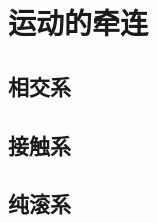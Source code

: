 

\section{运动的牵连}\label{2-4}

\subsection{相交系}\label{2-4-1}

\subsection{接触系}\label{2-4-2}

\subsection{纯滚系}\label{2-4-3}